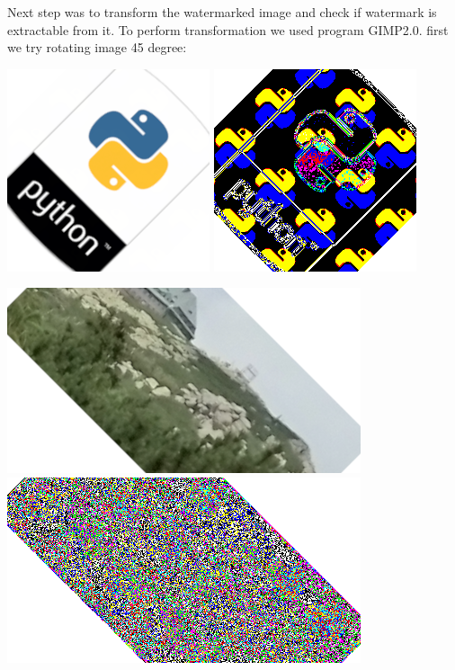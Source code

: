 \documentclass{article}
\begin{document}
    	Next step was to transform the watermarked image and check if watermark is extractable from it. To perform transformation we used program GIMP2.0. first we try rotating image 45 degree:

    	\includegraphics[scale=1.0]{python_lsb/watermark_python_rot45.png}
    	\includegraphics[scale=1.0]{python_lsb/watermark_watermark_python_rot45.png}

    	\includegraphics[scale=0.6]{photo_lsb/watermarked_photo_rot45.png}
    	\includegraphics[scale=0.6]{photo_lsb/watermark_watermarked_photo_rot45.png}
\end{document}

